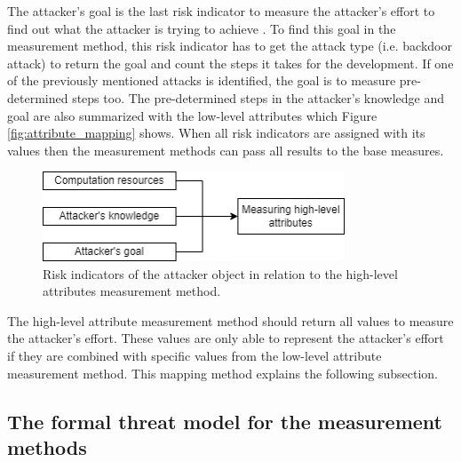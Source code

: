 The attacker's goal is the last risk indicator to measure the attacker's effort to find out what the attacker is trying to achieve \cite{DBLP:journals/corr/abs-2012-04884}. To find this goal in the measurement method, this risk indicator has to get the attack type (i.e. backdoor attack) to return the goal and count the steps it takes for the development. If one of the previously mentioned attacks is identified, the goal is to measure pre-determined steps too. The pre-determined steps in the attacker's knowledge and goal are also summarized with the low-level attributes which Figure \ref{fig:attribute_mapping} shows. When all risk indicators are assigned with its values then the measurement methods can pass all results to the base measures.

\begin{figure}[ht!]
  \centering
  \includegraphics[width=9cm]{pictures/measure_effort.png}
  \caption{Risk indicators of the attacker object in relation to the high-level attributes measurement method.}
  \label{fig:measure_effort}
\end{figure}

The high-level attribute measurement method should return all values to measure the attacker's effort. These values are only able to represent the attacker's effort if they are combined with specific values from the low-level attribute measurement method. This mapping method explains the following subsection.

\subsection{The formal threat model for the measurement methods}
\label{sec:use_threat_model}

